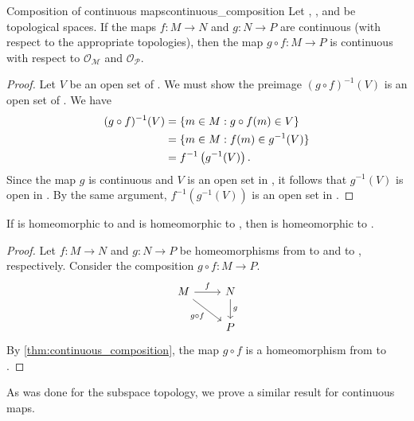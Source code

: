 \begin{theorem}{Composition of continuous maps}{continuous_composition}
    Let , , and  be topological spaces. If the maps \(f: M \to N\) and \(g : N \to P\) are continuous (with respect to the appropriate topologies), then the map \(g \circ f : M \to P\) is continuous with respect to \(\mathcal{O_M}\) and \(\mathcal{O_P}\).
\end{theorem}
\begin{proof}
    Let \(V\) be an open set of . We must show the preimage \((g \circ f)^{-1}(V)\) is an open set of . We have
    \begin{align*}
        (g\circ f)^{-1}(V) &= \{m \in M : g\circ f(m) \in V\}\\
                           &= \{m \in M : f(m) \in g^{-1}(V)\}\\
                           &= f^{-1}\left(g^{-1}(V)\right).
    \end{align*}
    Since the map \(g\) is continuous and \(V\) is an open set in , it follows that \(g^{-1}(V)\) is open in . By the same argument, \(f^{-1}\left(g^{-1}(V)\right)\) is an open set in .
\end{proof}

\begin{corollary}
    If  is homeomorphic to  and  is homeomorphic to , then  is homeomorphic to .
\end{corollary}
\begin{proof}
    Let \(f : M \to N\) and \(g : N \to P\) be homeomorphisms from  to  and  to , respectively. Consider the composition \(g\circ f : M \to P\).
    \[
    \begin{tikzcd}
        M \arrow{r}{f} \arrow[swap]{dr}{g\circ f} & N \arrow{d}{g} \\
                                            & P
    \end{tikzcd}
    \]
    By \cref{thm:continuous_composition}, the map \(g\circ f\) is a homeomorphism from  to .
\end{proof}

As was done for the subspace topology, we prove a similar result for continuous maps.

